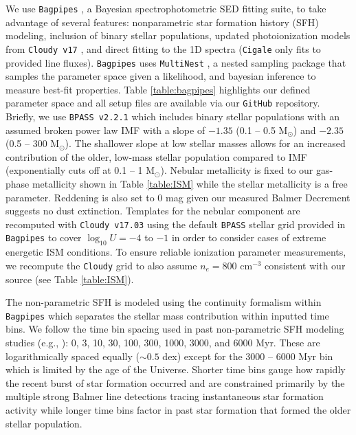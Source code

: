\documentclass[twocolumn,tight,times,linenumbers]{aastex631}
\newcommand{\msol}{M$_\odot$}
\begin{document}
		We use \texttt{Bagpipes} \citep{Carnall2018}, a Bayesian spectrophotometric SED fitting suite, to take advantage of several features: nonparametric star formation history (SFH) modeling, inclusion of binary stellar populations, updated photoionization models from \texttt{Cloudy v17} \citep{Ferland2017}, and direct fitting to the 1D spectra (\texttt{Cigale} only fits to provided line fluxes). \texttt{Bagpipes} uses \texttt{MultiNest} \citep{Feroz2008,Feroz2009,Feroz2019}, a nested sampling package that samples the parameter space given a likelihood, and bayesian inference to measure best-fit properties. Table \ref{table:bagpipes} highlights our defined parameter space and all setup files are available via our \texttt{GitHub} repository. Briefly, we use \texttt{BPASS v2.2.1} \citep{Stanway2018} which includes binary stellar populations with an assumed broken power law IMF with a slope of $-1.35$ (0.1 -- 0.5 \msol) and $-2.35$ (0.5 -- 300 \msol). The shallower slope at low stellar masses allows for an increased contribution of the older, low-mass stellar population compared to \citet{Chabrier2003} IMF (exponentially cuts off at 0.1 -- 1 \msol). Nebular metallicity is fixed to our gas-phase metallicity shown in Table \ref{table:ISM} while the stellar metallicity is a free parameter. Reddening is also set to 0 mag given our measured Balmer Decrement suggests no dust extinction. Templates for the nebular component are recomputed with \texttt{Cloudy v17.03} using the default \texttt{BPASS} stellar grid provided in \texttt{Bagpipes} to cover $\log_{10} U = -4$ to $-1$ in order to consider cases of extreme energetic ISM conditions. To ensure reliable ionization parameter measurements, we recompute the \texttt{Cloudy} grid to also assume $n_e = 800$ cm$^{-3}$ consistent with our source (see Table \ref{table:ISM}).
		
		The non-parametric SFH is modeled using the \cite{Leja2019} continuity formalism within \texttt{Bagpipes} which separates the stellar mass contribution within inputted time bins. We follow the time bin spacing used in past non-parametric SFH modeling studies (e.g., \citealt{Leja2017,Leja2019,Tacchella2022,Tang2022}): 0, 3, 10, 30, 100, 300, 1000, 3000, and 6000 Myr. These are logarithmically spaced equally ($\sim 0.5$ dex) except for the 3000 -- 6000 Myr bin which is limited by the age of the Universe. Shorter time bins gauge how rapidly the recent burst of star formation occurred and are constrained primarily by the multiple strong Balmer line detections tracing instantaneous star formation activity while longer time bins factor in past star formation that formed the older stellar population.
		
\end{document}
